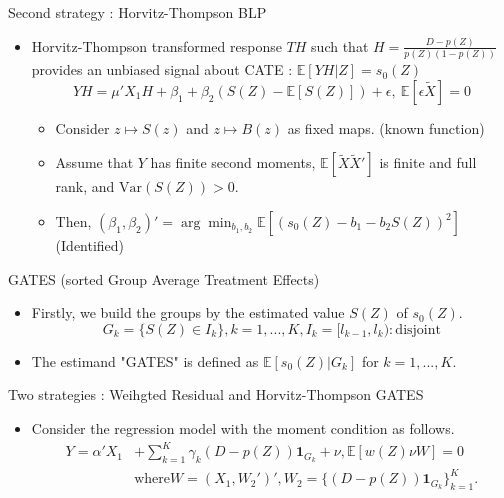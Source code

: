 \documentclass[xcolor=svgnames,aspectratio=169]{beamer}
\newcommand{\E}{\mathbb{E}}
\newcommand{\var}{\text{Var}}
\begin{document}
\begin{frame}{Second strategy : Horvitz-Thompson BLP}
    \begin{itemize}
        \item Horvitz-Thompson transformed response $TH$ such that $H=\frac{D-p(Z)}{p(Z)(1-p(Z))}$ provides an unbiased signal about CATE : $\E[YH|Z]=s_0(Z)$
        \[
        YH=\mu'X_1H+\beta_1+\beta_2(S(Z)-\E[S(Z)])+\epsilon, \ \E[\epsilon\tilde{X}]=0
        \]
        \begin{tcolorbox}[colframe=Cyan,title=Theorem 2]
        \begin{itemize}
            \item Consider $z\mapsto S(z)$ and $z\mapsto B(z)$ as fixed maps. (known function)
            \item Assume that $Y$ has finite second moments, $\E[\tilde{X}\tilde{X}']$ is finite and full rank, and $\var(S(Z))>0$.
            \item Then, $(\beta_1, \beta_2)'=\arg\min_{b_1,b_2}\E[(s_0(Z)-b_1-b_2 S(Z))^2]$ (Identified)
        \end{itemize}
    \end{tcolorbox}
    \end{itemize}
\end{frame}

\begin{frame}{GATES (sorted Group Average Treatment Effects)}
    \begin{itemize}
        \item Firstly, we build the groups by the estimated value $S(Z)$ of $s_0(Z)$.
        \[
        G_k=\{S(Z)\in I_k\}, k=1,...,K, I_k=[l_{k-1},l_k) : \text{disjoint}
        \]
        \item The estimand "GATES" is defined as $\E[s_0(Z)|G_k]$ for $k=1,...,K$.
        
    \end{itemize}
\end{frame}

\begin{frame}{Two strategies : Weihgted Residual and Horvitz-Thompson GATES}
    \begin{itemize}
        \item Consider the regression model with the moment condition as follows.
        \begin{align*}
            Y=\alpha'X_1&+\sum_{k=1}^{K}\gamma_k(D-p(Z))\mathbf{1}_{G_k}+\nu, \E[w(Z)\nu W]=0 \\
            &\text{where} W=(X_1, W_2')', W_2=\{(D-p(Z))\mathbf{1}_{G_k}\}_{k=1}^K.
        \end{align*}
    \end{itemize}
\end{frame}
\end{document}
